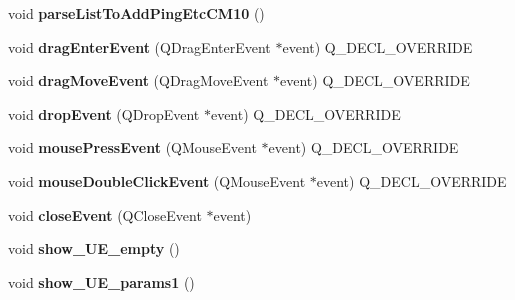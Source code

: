 \begin{DoxyCompactItemize}
\item 
void {\bfseries parse\+List\+To\+Add\+Ping\+Etc\+C\+M10} ()\hypertarget{class_map__traffic_a1c04b48453aee7056da27e8eee650ef5}{}\label{class_map__traffic_a1c04b48453aee7056da27e8eee650ef5}

\item 
void {\bfseries drag\+Enter\+Event} (Q\+Drag\+Enter\+Event $\ast$event) Q\+\_\+\+D\+E\+C\+L\+\_\+\+O\+V\+E\+R\+R\+I\+DE\hypertarget{class_map__traffic_a5d33ab31739abe358c551b0ad7e4f1d5}{}\label{class_map__traffic_a5d33ab31739abe358c551b0ad7e4f1d5}

\item 
void {\bfseries drag\+Move\+Event} (Q\+Drag\+Move\+Event $\ast$event) Q\+\_\+\+D\+E\+C\+L\+\_\+\+O\+V\+E\+R\+R\+I\+DE\hypertarget{class_map__traffic_a7a1141fcad7cb13e27771240746d2d90}{}\label{class_map__traffic_a7a1141fcad7cb13e27771240746d2d90}

\item 
void {\bfseries drop\+Event} (Q\+Drop\+Event $\ast$event) Q\+\_\+\+D\+E\+C\+L\+\_\+\+O\+V\+E\+R\+R\+I\+DE\hypertarget{class_map__traffic_a7de1333c24813b6be7bfeb404952a0ee}{}\label{class_map__traffic_a7de1333c24813b6be7bfeb404952a0ee}

\item 
void {\bfseries mouse\+Press\+Event} (Q\+Mouse\+Event $\ast$event) Q\+\_\+\+D\+E\+C\+L\+\_\+\+O\+V\+E\+R\+R\+I\+DE\hypertarget{class_map__traffic_a031874be230c03248ae08a2f8133fde5}{}\label{class_map__traffic_a031874be230c03248ae08a2f8133fde5}

\item 
void {\bfseries mouse\+Double\+Click\+Event} (Q\+Mouse\+Event $\ast$event) Q\+\_\+\+D\+E\+C\+L\+\_\+\+O\+V\+E\+R\+R\+I\+DE\hypertarget{class_map__traffic_ab56ab7351b03d85e9beba6c2c9295b7a}{}\label{class_map__traffic_ab56ab7351b03d85e9beba6c2c9295b7a}

\item 
void {\bfseries close\+Event} (Q\+Close\+Event $\ast$event)\hypertarget{class_map__traffic_a8decb9545ac5eb1b0262d6664f7ee302}{}\label{class_map__traffic_a8decb9545ac5eb1b0262d6664f7ee302}

\item 
void {\bfseries show\+\_\+\+U\+E\+\_\+empty} ()\hypertarget{class_map__traffic_a40ddb87647f059416c9488089fa7536b}{}\label{class_map__traffic_a40ddb87647f059416c9488089fa7536b}

\item 
void {\bfseries show\+\_\+\+U\+E\+\_\+params1} ()\hypertarget{class_map__traffic_a6d3dadbca581d7a221bc5bdef5ad5b99}{}\label{class_map__traffic_a6d3dadbca581d7a221bc5bdef5ad5b99}


\end{DoxyCompactItemize}
